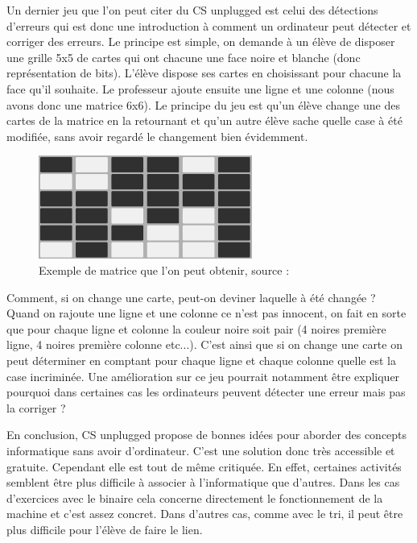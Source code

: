 Un dernier jeu que l'on peut citer du CS unplugged est celui des détections d'erreurs qui est donc une introduction à comment un ordinateur peut détecter et corriger des erreurs. Le principe est simple, on demande à un élève de disposer une grille 5x5 de cartes qui ont chacune une face noire et blanche (donc représentation de bits). L'élève dispose ses cartes en choisissant pour chacune la face qu'il souhaite. Le professeur ajoute ensuite une ligne et une colonne (nous avons donc une matrice 6x6). Le principe du jeu est qu'un élève change une des cartes de la matrice en la retournant et qu'un autre élève sache quelle case à été modifiée, sans avoir regardé le changement bien évidemment.

\begin{figure}[!htb]
  \centering
  \includegraphics[width=70mm,scale=0.5]{images/error-detection.PNG}
  \caption{Exemple de matrice que l'on peut obtenir, source : \cite{33}}
  \label{fig:boat1}
\end{figure}

Comment, si on change une carte, peut-on deviner laquelle à été changée ? Quand on rajoute une ligne et une colonne ce n'est pas innocent, on fait en sorte que pour chaque ligne et colonne la couleur noire soit pair (4 noires première ligne, 4 noires première colonne etc...). C'est ainsi que si on change une carte on peut déterminer en comptant pour chaque ligne et chaque colonne quelle est la case incriminée. Une amélioration sur ce jeu pourrait notamment être expliquer pourquoi dans certaines cas les ordinateurs peuvent détecter une erreur mais pas la corriger ?

En conclusion, CS unplugged propose de bonnes idées pour aborder des concepts informatique sans avoir d'ordinateur. C'est une solution donc très accessible et gratuite. Cependant elle est tout de même critiquée. \cite{34} En effet, certaines activités semblent être plus difficile à associer à l'informatique que d'autres. Dans les cas d'exercices avec le binaire cela concerne directement le fonctionnement de la machine et c'est assez concret. Dans d'autres cas, comme avec le tri, il peut être plus difficile pour l'élève de faire le lien.

